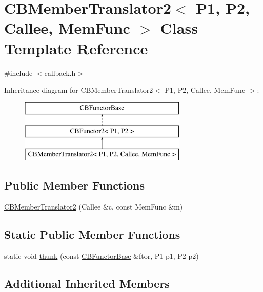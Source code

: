 \hypertarget{class_c_b_member_translator2}{\section{C\+B\+Member\+Translator2$<$ P1, P2, Callee, Mem\+Func $>$ Class Template Reference}
\label{class_c_b_member_translator2}
}


{\ttfamily \#include $<$callback.\+h$>$}

Inheritance diagram for C\+B\+Member\+Translator2$<$ P1, P2, Callee, Mem\+Func $>$\+:\begin{figure}[H]
\begin{center}
\leavevmode
\includegraphics[height=3.000000cm]{class_c_b_member_translator2}
\end{center}
\end{figure}
\subsection*{Public Member Functions}
\begin{DoxyCompactItemize}
\item 
\hyperlink{class_c_b_member_translator2_af8ffe32f73ed778d2f232a08127dc4cc}{C\+B\+Member\+Translator2} (Callee \&c, const Mem\+Func \&m)
\end{DoxyCompactItemize}
\subsection*{Static Public Member Functions}
\begin{DoxyCompactItemize}
\item 
static void \hyperlink{class_c_b_member_translator2_aaf39115b5d5157229b06a8be0e413b5d}{thunk} (const \hyperlink{class_c_b_functor_base}{C\+B\+Functor\+Base} \&ftor, P1 p1, P2 p2)
\end{DoxyCompactItemize}
\subsection*{Additional Inherited Members}


